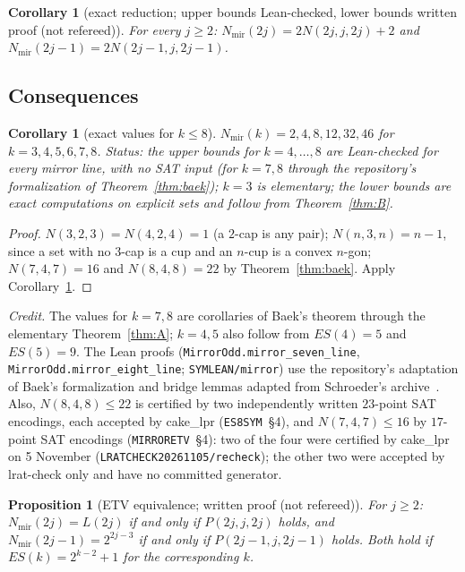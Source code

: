 \documentclass[10pt]{article}
\newtheorem{proposition}[theorem]{Proposition}
\newtheorem{corollary}[theorem]{Corollary}
\theoremstyle{definition}
\theoremstyle{remark}
\newcommand{\Nm}{N_{\mathrm{mir}}}
\newcommand{\dirn}[1]{{\upshape\nolinkurl{#1}}}
\newcommand{\lean}[1]{{\upshape\nolinkurl{#1}}}
\begin{document}
\begin{corollary}[exact reduction; upper bounds Lean-checked, lower bounds written proof (not refereed)]\label{cor:identities}
For every $j\ge2$: $\Nm(2j)=2N(2j,j,2j)+2$ and $\Nm(2j-1)=2N(2j-1,j,2j-1)$.
\end{corollary}

\subsection{Consequences}

\begin{corollary}[exact values for $k\le8$]\label{cor:small}
$\Nm(k)=2,4,8,12,32,46$ for $k=3,4,5,6,7,8$. \emph{Status:} the upper bounds for $k=4,\dots,8$ are Lean-checked for
every mirror line, with no SAT input (for $k=7,8$ through the repository's formalization of Theorem~\ref{thm:baek});
$k=3$ is elementary; the lower bounds are exact computations on explicit sets and follow from Theorem~\ref{thm:B}.
\end{corollary}

\begin{proof}
$N(3,2,3)=N(4,2,4)=1$ (a $2$-cap is any pair); $N(n,3,n)=n-1$, since a set with no $3$-cap is a cup and an $n$-cup is a
convex $n$-gon; $N(7,4,7)=16$ and $N(8,4,8)=22$ by Theorem~\ref{thm:baek}. Apply Corollary~\ref{cor:identities}.
\end{proof}

\noindent\emph{Credit.} The values for $k=7,8$ are corollaries of Baek's theorem through the elementary
Theorem~\ref{thm:A}; $k=4,5$ also follow from $ES(4)=5$ and $ES(5)=9$. The Lean proofs (\lean{MirrorOdd.mirror_seven_line},
\lean{MirrorOdd.mirror_eight_line}; \dirn{SYMLEAN/mirror}) use the repository's adaptation of Baek's formalization and
bridge lemmas adapted from Schroeder's archive~\cite{Sch26}. Also, $N(8,4,8)\le22$ is certified by two independently
written $23$-point SAT encodings, each accepted by cake\_lpr (\dirn{ES8SYM}~\S4), and $N(7,4,7)\le16$ by $17$-point
SAT encodings (\dirn{MIRRORETV}~\S4): two of the four were certified by cake\_lpr on 5 November
(\dirn{LRATCHECK20261105/recheck}); the other two were accepted by lrat-check only and have no committed generator.

\begin{proposition}[ETV equivalence; written proof (not refereed)]\label{prop:etv}
For $j\ge2$: $\Nm(2j)=L(2j)$ if and only if $P(2j,j,2j)$ holds, and $\Nm(2j-1)=2^{2j-3}$ if and only if
$P(2j-1,j,2j-1)$ holds. Both hold if $ES(k)=2^{k-2}+1$ for the corresponding $k$.
\end{proposition}
\end{document}
